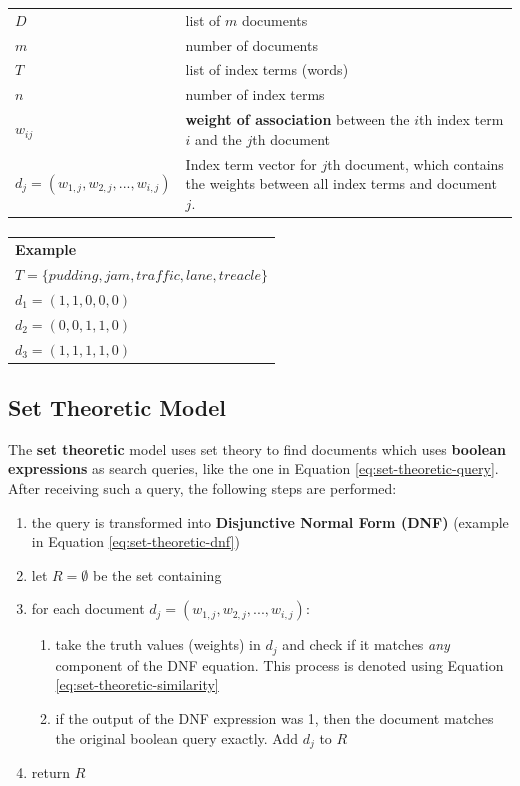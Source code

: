 \documentclass{article}
\begin{document}
\begin{tabular}{p{4cm}p{12cm}}
	$D$ & list of $m$ documents \\
	$m$ & number of documents \\
	$T$ & list of index terms (words) \\
	$n$ & number of index terms \\
	$w_{ij}$ & \textbf{weight of association} between the $i$th index term $i$ and the $j$th document \\
	$d_j = (w_{1,j}, w_{2,j}, ..., w_{i,j})$ & Index term vector for $j$th document, which contains the weights between all index terms and document $j$.
\end{tabular}

\paragraph{}

\begin{tabular}{p{16cm}}
	\textbf{Example} \\
	$T = \lbrace pudding, jam, traffic, lane, treacle \rbrace$ \\
	$d_1 = (1, 1, 0, 0, 0)$ \\
	$d_2 = (0, 0, 1, 1, 0)$ \\
	$d_3 = (1, 1, 1, 1, 0)$ \\
\end{tabular}

\subsection{Set Theoretic Model}

The \textbf{set theoretic} model uses set theory to find documents which uses \textbf{boolean expressions} as search queries, like the one in Equation \ref{eq:set-theoretic-query}. After receiving such a query, the following steps are performed:
\begin{enumerate}
	\item the query is transformed into \textbf{Disjunctive Normal Form (DNF)} (example in Equation \ref{eq:set-theoretic-dnf})
	\item let $R = \emptyset$ be the set containing
	\item for each document $d_j = (w_{1,j}, w_{2,j}, ..., w_{i,j})$:
	\begin{enumerate}
		\item take the truth values (weights) in $d_j$ and check if it matches \textit{any} component of the DNF equation. This process is denoted using Equation \ref{eq:set-theoretic-similarity}
		\item if the output of the DNF expression was 1, then the document matches the original boolean query exactly. Add $d_j$ to $R$
	\end{enumerate}
	\item return $R$
\end{enumerate}
\end{document}
